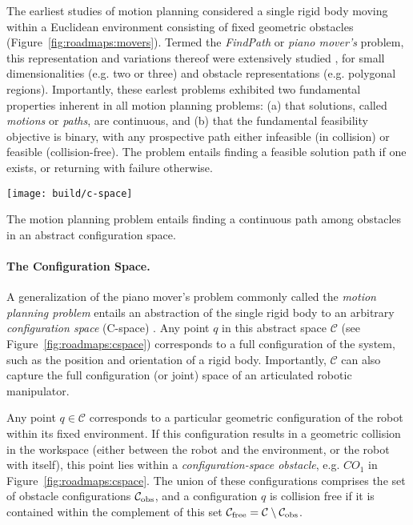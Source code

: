 The earliest studies of motion planning considered a single rigid
body moving within a Euclidean environment consisting of
fixed geometric obstacles
(Figure~\ref{fig:roadmaps:movers}).
Termed the \emph{FindPath} or \emph{piano mover's} problem,
this representation and variations thereof were extensively studied
\citep{lozanoperezwedley1979collisionfree,
   schwartzsharir1983pianomovers1},
for small dimensionalities (e.g. two or three)
and obstacle representations (e.g. polygonal regions).
Importantly,
these earlest problems exhibited two fundamental properties
inherent in all motion planning problems:
(a) that solutions,
called \emph{motions} or \emph{paths},
are continuous, and
(b) that the fundamental feasibility objective is binary,
with any prospective path either infeasible (in collision)
or feasible (collision-free).
The problem entails finding a feasible solution path if one exists,
or returning with failure otherwise.

\begin{marginfigure}
   \centering
   \texttt{[image: build/c-space]} %
   \caption{The motion planning problem entails finding a continuous
      path among obstacles in an abstract configuration space.}
   \label{fig:roadmaps:cspace}
\end{marginfigure}

\paragraph{The Configuration Space.}
A generalization of the piano mover's problem
commonly called the \emph{motion planning problem}
entails an abstraction of the single rigid body
to an arbitrary \emph{configuration space} (C-space)
\citep{lozanoperez1983cspace}.
Any point $q$ in this abstract space $\mathcal{C}$
(see Figure~\ref{fig:roadmaps:cspace})
corresponds to a full configuration of the system,
such as the position and orientation of a rigid body.
Importantly,
$\mathcal{C}$ can also capture the full configuration (or joint)
space of an articulated robotic manipulator.

Any point $q \in \mathcal{C}$ corresponds to a particular geometric
configuration of the robot within its fixed environment.
If this configuration results in a geometric collision in the workspace
(either between the robot and the environment,
or the robot with itself),
this point lies within a \emph{configuration-space obstacle},
e.g. $CO_1$ in Figure~\ref{fig:roadmaps:cspace}.
The union of these configurations comprises the set of obstacle
configurations $\mathcal{C}_{\mbox{\scriptsize obs}}$,
and a configuration $q$ is collision free if
it is contained within the complement of this set
$\mathcal{C}_{\mbox{\scriptsize free}} = \mathcal{C} \setminus \mathcal{C}_{\mbox{\scriptsize obs}}$.


